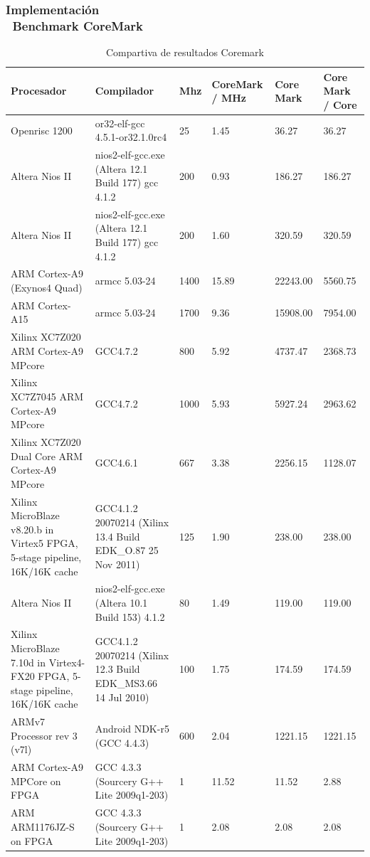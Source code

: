 \documentclass[xcolor=dvipsnames,mathserif,9pt]{beamer}
\begin{document}
\begin{frame} \frametitle{Implementación\\ \ Benchmark CoreMark }
 
\begin{table}[h!]
\begin{center}
\begin{tabular}{ |p{2cm} |p{3cm}|p{0.8cm}|p{1.5cm}|p{1cm}|p{1cm}|}
\hline
\rowcolor[gray]{0.8} Procesador &	Compilador &	 Mhz &	CoreMark / MHz &	Core Mark &	 Core Mark / Core \\
\hline
	Openrisc 1200 & or32-elf-gcc 4.5.1-or32.1.0rc4							&25		&1.45   &36.27		&36.27 \\
\hline
	Altera Nios II & nios2-elf-gcc.exe (Altera 12.1 Build 177) gcc 4.1.2	&200	&0.93 	&186.27 	&186.27\\
\hline
	Altera Nios II & nios2-elf-gcc.exe (Altera 12.1 Build 177) gcc 4.1.2	&200	&1.60 	&320.59 	&320.59\\
\hline
	ARM Cortex-A9  (Exynos4 Quad) &	armcc 5.03-24							&1400	&15.89 	&22243.00 	&5560.75\\
\hline
	ARM Cortex-A15 &	armcc 5.03-24											&1700	&9.36 	&15908.00 	&7954.00\\
\hline
	Xilinx XC7Z020 ARM Cortex-A9 MPcore &	GCC4.7.2							&800	&5.92 	&4737.47 	&2368.73\\
\hline
	Xilinx XC7Z7045 ARM Cortex-A9 MPcore&	GCC4.7.2						&1000	&5.93 	&5927.24 	&2963.62\\
\hline
	Xilinx XC7Z020 Dual Core ARM Cortex-A9 MPcore&	GCC4.6.1				&667	&3.38 	&2256.15 	&1128.07\\
\hline
	Xilinx MicroBlaze v8.20.b in Virtex5 FPGA, 5-stage pipeline, 16K/16K cache &	GCC4.1.2 20070214 (Xilinx 13.4 Build EDK\_O.87 25 Nov 2011)	
																			&125	&1.90   &238.00 	&238.00 \\
\hline
	Altera Nios II &	nios2-elf-gcc.exe (Altera 10.1 Build 153) 4.1.2			&80		&1.49 	&119.00		&119.00\\
\hline
	Xilinx MicroBlaze 7.10d in Virtex4-FX20 FPGA, 5-stage pipeline, 16K/16K cache&	GCC4.1.2 20070214 (Xilinx 12.3 Build EDK\_MS3.66 14 Jul 2010)	
																			&100	&1.75	&174.59 	&174.59\\
\hline
	ARMv7 Processor rev 3 (v7l) &	Android NDK-r5 (GCC 4.4.3)					&600	&2.04 	&1221.15	&1221.15\\ 
\hline
	ARM Cortex-A9 MPCore on FPGA &	GCC 4.3.3 (Sourcery G++ Lite 2009q1-203)		&1		&11.52 	&11.52 		&2.88 	 	\\
\hline
	ARM ARM1176JZ-S	on FPGA & GCC 4.3.3 (Sourcery G++ Lite 2009q1-203)				&1		&2.08 	&2.08 		&2.08		\\
\hline
\end{tabular}
\end{center}
\caption{Compartiva de resultados Coremark}
\label{tab:compcoremark}
\end{table}
\end{frame}
\end{document}
